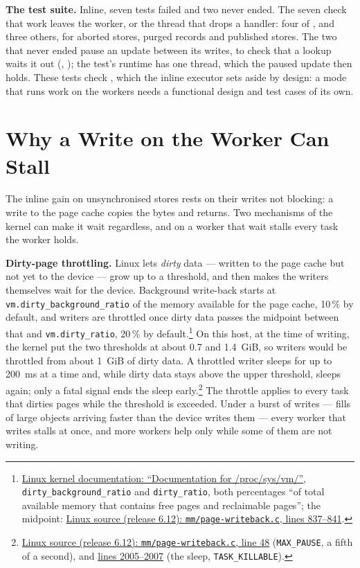\textbf{The test suite.} Inline, seven tests failed and two never ended.
The seven check that work leaves the worker, or the thread that drops a
handler: four of , and three others, for
aborted stores, purged records and published stores. The two that never
ended pause an update between its writes, to check that a lookup waits it
out (, ); the
test's runtime has one thread, which the paused update then holds. These
tests check , which the inline executor
sets aside by design: a mode that runs work on the workers needs a
functional design and test cases of its own.

\section{Why a Write on the Worker Can Stall}
\label{app:executor-stalls}

The inline gain on unsynchronised stores rests on their writes not
blocking: a write to the page cache copies the bytes and returns. Two
mechanisms of the kernel can make it wait regardless, and on a worker that
wait stalls every task the worker holds.

\textbf{Dirty-page throttling.} Linux lets \emph{dirty} data --- written to
the page cache but not yet to the device --- grow up to a threshold, and
then makes the writers themselves wait for the device. Background
write-back starts at \texttt{vm.dirty\_background\_ratio} of the memory
available for the page cache, 10\,\% by default, and writers are throttled
once dirty data passes the midpoint between that and
\texttt{vm.dirty\_ratio}, 20\,\% by
default.\footnote{\href{https://www.kernel.org/doc/html/latest/admin-guide/sysctl/vm.html\#dirty-ratio}{Linux
kernel documentation: ``Documentation for /proc/sys/vm/''},
\texttt{dirty\_background\_ratio} and \texttt{dirty\_ratio}, both percentages
``of total available memory that contains free pages and reclaimable
pages''; the midpoint:
\href{https://github.com/torvalds/linux/blob/v6.12/mm/page-writeback.c\#L837-L841}{Linux
source (release 6.12): \texttt{mm/page-writeback.c}, lines 837--841}.} On this
host, at the time of writing, the kernel put the two thresholds at about
0.7 and 1.4~GiB, so writers would be throttled from about 1~GiB of dirty
data. A throttled writer sleeps for up to 200~ms at a time and, while dirty
data stays above the upper threshold, sleeps again; only a fatal signal
ends the sleep
early.\footnote{\href{https://github.com/torvalds/linux/blob/v6.12/mm/page-writeback.c\#L48}{Linux
source (release 6.12): \texttt{mm/page-writeback.c}, line 48}
(\texttt{MAX\_PAUSE}, a fifth of a second), and
\href{https://github.com/torvalds/linux/blob/v6.12/mm/page-writeback.c\#L2005-L2007}{lines
2005--2007} (the sleep, \texttt{TASK\_KILLABLE}).} The throttle applies to
every task that dirties pages while the threshold is exceeded. Under a burst
of writes --- fills of large objects arriving faster than the device writes
them --- every worker that writes stalls at once, and more workers help only
while some of them are not writing.

